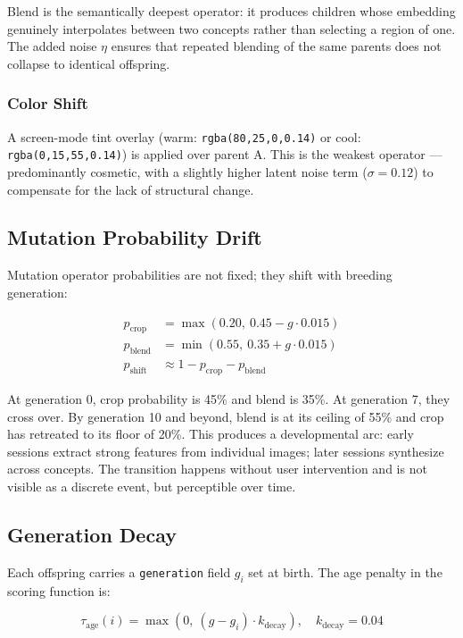 \documentclass[12pt, a4paper]{article}
\begin{document}
Blend is the semantically deepest operator: it produces children whose embedding genuinely interpolates between two concepts rather than selecting a region of one. The added noise $\eta$ ensures that repeated blending of the same parents does not collapse to identical offspring.

\subsubsection{Color Shift}

A screen-mode tint overlay (warm: \texttt{rgba(80,25,0,0.14)} or cool: \texttt{rgba(0,15,55,0.14)}) is applied over parent A. This is the weakest operator --- predominantly cosmetic, with a slightly higher latent noise term ($\sigma = 0.12$) to compensate for the lack of structural change.

\subsection{Mutation Probability Drift}

Mutation operator probabilities are not fixed; they shift with breeding generation:

\begin{align}
p_{\text{crop}}  &= \max(0.20,\ 0.45 - g \cdot 0.015) \\
p_{\text{blend}} &= \min(0.55,\ 0.35 + g \cdot 0.015) \\
p_{\text{shift}} &\approx 1 - p_{\text{crop}} - p_{\text{blend}}
\end{align}

At generation 0, crop probability is 45\% and blend is 35\%. At generation 7, they cross over. By generation 10 and beyond, blend is at its ceiling of 55\% and crop has retreated to its floor of 20\%. This produces a developmental arc: early sessions extract strong features from individual images; later sessions synthesize across concepts. The transition happens without user intervention and is not visible as a discrete event, but perceptible over time.

\subsection{Generation Decay}

Each offspring carries a \texttt{generation} field $g_i$ set at birth. The age penalty in the scoring function is:

\begin{equation}
\tau_{\text{age}}(i) = \max(0,\ (g - g_i) \cdot k_{\text{decay}}), \quad k_{\text{decay}} = 0.04
\end{equation}
\end{document}
